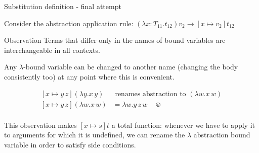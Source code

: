 \documentclass[8pt]{beamer}
\begin{document}
\begin{frame}{Substitution definition - final attempt}

    Consider the abstraction application rule:
        $(\lambda x:T_{11}.t_{12})v_{2} \rightarrow [x \mapsto v_{2}]t_{12}$

    \begin{block}{Observation}
        Terms that differ only in the names of bound variables are 
        interchangeable in all contexts.
    \end{block}

    \pause

    Any $\lambda$-bound variable can be changed to another name (changing the body 
    consistently too) at any point where this is convenient.

    \begin{example}
        \begin{displaymath}
            \begin{split}
                [x \mapsto y \, z](\lambda y.x \, y) &
                    \text{ renames abstraction to } (\lambda w.x \, w)\\ 
                [x \mapsto y \, z](\lambda w.x \, w) &= \lambda w. y \, z \, w 
                    \quad \smiley\\
            \end{split}
        \end{displaymath}
    \end{example}

    \pause

    This observation makes $[x \mapsto s]t$ a total function: 
    whenever we have to apply it to arguments for which it is 
    undefined, we can rename the $\lambda$ abstraction bound variable
    in order to satisfy side conditions.
\end{frame}
\end{document}
